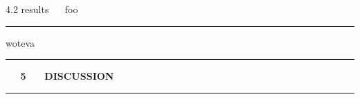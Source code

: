 \documentclass[11pt, compress, t, notes = noshow, xcolor = table, 
aspectratio = 1610]{beamer}
\newcommand{\highlight}[1]{\textcolor{highlightcol}{\textbf{#1}}}
\newcommand{\flexitem}[1]{\item[$\highlight{#1}$]}
\begin{document}

\LARGE
\begin{frame}{\textcolor{gray!90}{4.2 results} ~~ foo}
\normalsize
\vspace{-0.5cm}
\noindent \textcolor{gray!90}{\rule{\textwidth}{1pt}}


\medskip

woteva

\end{frame}


% 
% 


\LARGE
\begin{frame}{\phantom{foo}}
\normalsize
\vspace{-0.5cm}
\noindent \textcolor{gray!90}{\rule{\textwidth}{1pt}}
\smallskip

\Huge
\hspace{0pt}
\vfill
\textbf{\highlight{~~ 5 ~~ DISCUSSION}}
\vfill
\hspace{0pt}

\noindent \textcolor{gray!90}{\rule{\textwidth}{1pt}}

\end{frame}
\end{document}
